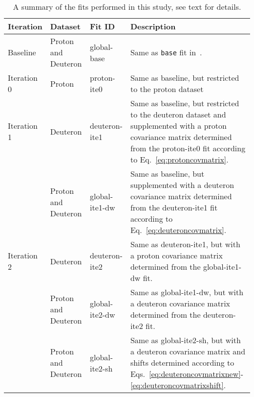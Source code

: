 \begin{table}[!t]
  \centering
  \scriptsize
  \renewcommand{\arraystretch}{1.13}
  \begin{tabularx}{\textwidth}{lllX}
    \toprule
    \rowcolor{gray!40}
    {\bf Iteration }  & {\bf Dataset }            & {\bf Fit ID }        & { \bf Description }\\
    \midrule
    Baseline    & Proton and Deuteron & global-base    & Same as {\tt base} fit in~\cite{Faura:2020oom}.\\
    \midrule
    Iteration 0 & Proton              & proton-ite0    & Same as baseline, but restricted to the proton dataset\\
    \midrule
    Iteration 1 & Deuteron            & deuteron-ite1  & Same as baseline, but restricted to the deuteron dataset
                                                         and supplemented with a proton covariance matrix determined
                                                         from the proton-ite0 fit according to
                                                         Eq.~\eqref{eq:protoncovmatrix}.\\
                & Proton and Deuteron & global-ite1-dw & Same as baseline, but supplemented with a deuteron covariance
                                                         matrix determined from the deuteron-ite1 fit according to
                                                         Eq.~\eqref{eq:deuteroncovmatrix}.\\
    \midrule
    Iteration 2 & Deuteron            & deuteron-ite2  & Same as deuteron-ite1, but with a proton covariance matrix
                                                         determined from the global-ite1-dw fit.\\
                & Proton and Deuteron & global-ite2-dw & Same as global-ite1-dw, but with a deuteron covariance matrix
                                                         determined from the deuteron-ite2 fit.\\
                & Proton and Deuteron & global-ite2-sh & Same as global-ite2-sh, but with a deuteron covariance matrix
                                                         and shifts determined according to
                                                         Eqs.~\eqref{eq:deuteroncovmatrixnew}-\eqref{eq:deuteroncovmatrixshift}.\\
    \bottomrule
  \end{tabularx}
  \caption{A summary of the fits performed in this study, see text for details.}
  \label{tab:fits}
\end{table}
